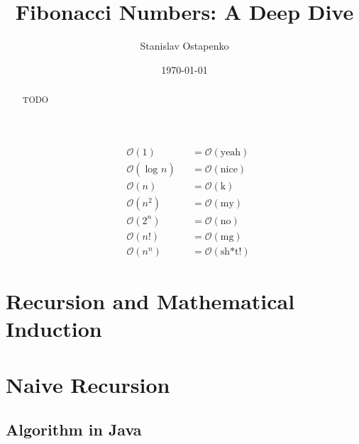 \documentclass{article}
\begin{document}


\title{Fibonacci Numbers: A Deep Dive}
\author{Stanislav Ostapenko}
\date{\today}
\maketitle

\begin{abstract}
	TODO
\end{abstract}

\clearpage

	\tableofcontents %

	\clearpage
	
	\lstlistoflistings %

\clearpage %

\clearpage

	\thispagestyle{empty}

	\vspace*{\fill}
	\begin{center}
		\Huge
		\begin{align*}
			&   \mathcal{O}(1) &&= \mathcal{O}(\text{yeah})\\
			&    \mathcal{O}(\log_{} n) &&= \mathcal{O}(\text{nice})\\
			&    \mathcal{O}(n) &&= \mathcal{O}(\text{k})\\
			&    \mathcal{O}(n^{2}) &&= \mathcal{O}(\text{my})\\
			&    \mathcal{O}(2^{n}) &&= \mathcal{O}(\text{no})\\
			&    \mathcal{O}(n!) &&= \mathcal{O}(\text{mg})\\
			&    \mathcal{O}(n^{n}) &&= \mathcal{O}(\text{sh*t!})
		\end{align*}
	\end{center}
	\vspace*{\fill}

\clearpage

\section{Recursion and Mathematical Induction}
\section{Naive Recursion}
\subsection{Algorithm in Java}
\end{document}

